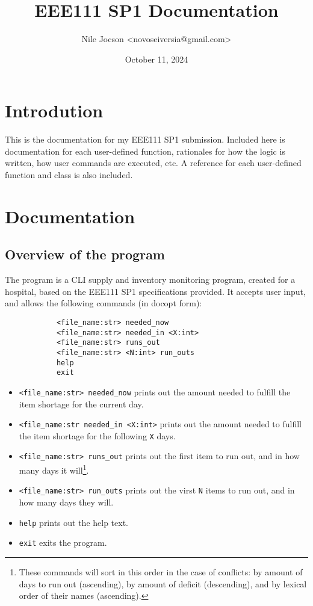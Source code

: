 \documentclass{article}
\title{EEE111 SP1 Documentation}
\author{Nile Jocson \textless{novoseiversia@gmail.com}\textgreater}
\date{October 11, 2024}
\begin{document}
	\maketitle
		\pagebreak



	\tableofcontents
		\pagebreak



	\section{Introdution}
		This is the documentation for my EEE111 SP1 submission. Included here is
		documentation for each user-defined function, rationales for how the logic
		is written, how user commands are executed, etc. A reference for each user-defined
		function and class is also included.
		\newpage



	\section{Documentation}
		\subsection{Overview of the program}
			The program is a CLI supply and inventory monitoring program,
			created for a hospital, based on the EEE111 SP1 specifications
			provided. It accepts user input, and allows the following commands
			(in docopt form):

			\begin{verbatim}
			<file_name:str> needed_now
			<file_name:str> needed_in <X:int>
			<file_name:str> runs_out
			<file_name:str> <N:int> run_outs
			help
			exit
			\end{verbatim}

			\begin{itemize}
				\item \verb|<file_name:str> needed_now| prints out the amount needed to fulfill
			the item shortage for the current day.

				\item \verb|<file_name:str needed_in <X:int>| prints out the amount needed to
				fulfill the item shortage for the following \verb|X| days.

				\item \verb|<file_name:str> runs_out| prints out the first item to run out, and
				in how many days it will\footnote{
					These commands will sort in this order in the case of conflicts:
					by amount of days to run out (ascending),
					by amount of deficit (descending),
					and by lexical order of their names (ascending).
				}.

				\item \verb|<file_name:str> run_outs| prints out the virst \verb|N| items to run
				out, and in how many days they will\footnotemark[\value{footnote}].

				\item \verb|help| prints out the help text.

				\item \verb|exit| exits the program.
			\end{itemize}
\end{document}
